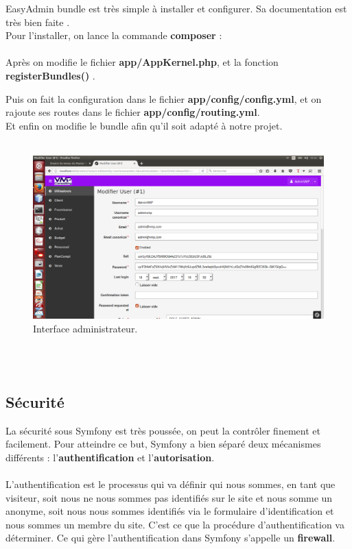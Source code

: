 \documentclass[12pt]{article}
\begin{document}
 EasyAdmin bundle est très simple à installer et configurer. Sa documentation est très bien faite .
\\
Pour l'installer, on lance la commande \textbf{composer} :\\

  \\

Après on modifie  le fichier\textbf{ app/AppKernel.php}, et la fonction \textbf{registerBundles()} .


Puis on fait  la configuration  dans le fichier \textbf{app/config/config.yml}, et on rajoute ses routes dans le fichier \textbf{app/config/routing.yml}.\\

Et enfin on modifie le bundle  afin qu'il soit adapté à notre projet.\\ \\

\begin{center}
\begin{figure}[htp]
  \centering
  \includegraphics[width=12cm]{v8.png}
  \caption{Interface administrateur.}
  \label{fig:une-autre-image}
\end{figure} \\ \\
\end{center}


\subsection{Sécurité}
La sécurité sous Symfony est très poussée, on peut la contrôler  finement et facilement. 
Pour atteindre ce but, Symfony a bien séparé deux mécanismes différents : l'\textbf{authentification} et l'\textbf{autorisation}.
\\
\\
L'authentification est le processus qui va définir qui nous sommes, en tant que visiteur,  soit nous ne nous sommes pas identifiés sur le site et nous somme un anonyme, soit nous nous sommes identifiés via le formulaire d'identification  et nous sommes un membre du site. C'est ce que la procédure d'authentification va déterminer. Ce qui gère l'authentification dans Symfony s'appelle un \textbf{firewall}.\\
\\
\end{document}
